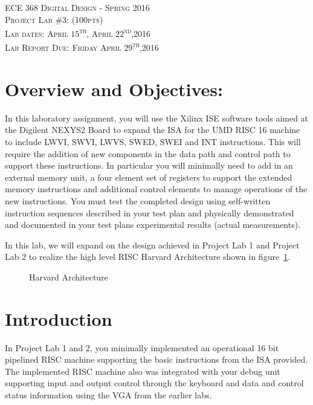 \documentclass{article}
\begin{document}
\begin{center}
\textsc{\huge ECE 368 Digital Design - Spring 2016}\\[1cm]
\textsc{{\LARGE Project Lab \#3: (100pts)}}\\[0.5cm]
\textsc{\Large Lab dates: April $15$\textsuperscript{th}, April $22$\textsuperscript{nd},2016}\\[0.5cm]
\textsc{\Large Lab Report Due: Friday April $29$\textsuperscript{th},2016}\\[1cm]
\end{center}

\section{Overview and Objectives:}
In this laboratory assignment, you will use the Xilinx ISE software tools aimed at the Digilent NEXYS2 Board to expand the ISA for the UMD RISC 16 machine to include LWVI, SWVI, LWVS, SWED, SWEI and INT instructions. This will require the addition of new components in the data path and control path to support these instructions. In particular you will minimally need to add in an external memory unit, a four element set of registers to support the extended memory instructions and additional control elements to manage operations of the new instructions. You must test the completed design using self-written instruction sequences described in your test plan and physically demonstrated and documented in your test plans experimental results (actual measurements).

In this lab, we will expand on the design achieved in Project Lab 1 and Project Lab 2 to realize the high level RISC Harvard Architecture shown in figure~\ref{fig:harvardarc}.

\begin{figure}[!htbp]
  \centering
  \caption{Harvard Architecture}
  \label{fig:harvardarc}
\end{figure}
\FloatBarrier

\section{Introduction}

In Project Lab 1 and 2, you minimally implemented an operational 16 bit pipelined RISC machine supporting the basic instructions from the ISA provided. The implemented RISC machine also was integrated with your debug unit supporting input and output control through the keyboard and data and control status information using the VGA from the earlier labs. 
\end{document}
